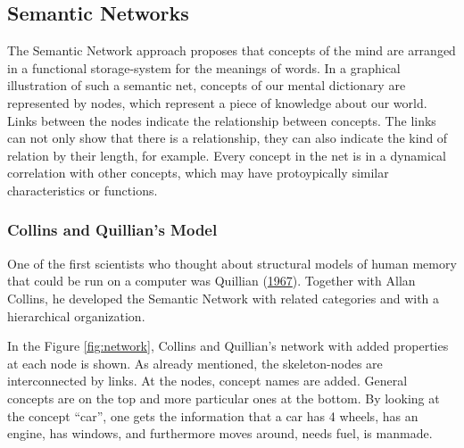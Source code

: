 \documentclass[
]{krantz}
\begin{document}
\hypertarget{semantic-networks}{%
\subsection*{Semantic Networks}\label{semantic-networks}}


The Semantic Network approach proposes that concepts of the mind are arranged in a functional storage-system for the meanings of words. In a graphical illustration of such a semantic net, concepts of our mental dictionary are represented by nodes, which represent a piece of knowledge about our world. Links between the nodes indicate the relationship between concepts. The links can not only show that there is a relationship, they can also indicate the kind of relation by their length, for example. Every concept in the net is in a dynamical correlation with other concepts, which may have protoypically similar characteristics or functions.

\hypertarget{collins-and-quillians-model}{%
\subsubsection*{Collins and Quillian's Model}\label{collins-and-quillians-model}}


One of the first scientists who thought about structural models of human memory that could be run on a computer was Quillian (\protect\hyperlink{ref-quillian1967word}{1967}). Together with Allan Collins, he developed the Semantic Network with related categories and with a hierarchical organization.

In the Figure \ref{fig:network}, Collins and Quillian's network with added properties at each node is shown. As already mentioned, the skeleton-nodes are interconnected by links. At the nodes, concept names are added. General concepts are on the top and more particular ones at the bottom. By looking at the concept ``car'', one gets the information that a car has 4 wheels, has an engine, has windows, and furthermore moves around, needs fuel, is manmade.
\end{document}
